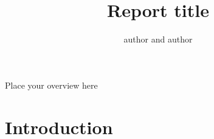 \documentclass[continuous]{grattan}
\title{Report title}
\author{author and author}
\begin{document}
\layout


\begin{overview} 
Place your overview here
\end{overview}

\contentspage

\listoffigures

\chapter{Introduction}
\end{document}
